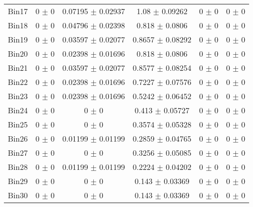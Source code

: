 \begin{tabular}{@{\extracolsep{4pt}}lccccc@{}}
     Bin17 & 0 $\pm$ 0 & 0.07195 $\pm$ 0.02937 & 1.08 $\pm$ 0.09262 & 0 $\pm$ 0 & 0 $\pm$ 0 \\ 
     Bin18 & 0 $\pm$ 0 & 0.04796 $\pm$ 0.02398 & 0.818 $\pm$ 0.0806 & 0 $\pm$ 0 & 0 $\pm$ 0 \\ 
     Bin19 & 0 $\pm$ 0 & 0.03597 $\pm$ 0.02077 & 0.8657 $\pm$ 0.08292 & 0 $\pm$ 0 & 0 $\pm$ 0 \\ 
     Bin20 & 0 $\pm$ 0 & 0.02398 $\pm$ 0.01696 & 0.818 $\pm$ 0.0806 & 0 $\pm$ 0 & 0 $\pm$ 0 \\ 
     Bin21 & 0 $\pm$ 0 & 0.03597 $\pm$ 0.02077 & 0.8577 $\pm$ 0.08254 & 0 $\pm$ 0 & 0 $\pm$ 0 \\ 
     Bin22 & 0 $\pm$ 0 & 0.02398 $\pm$ 0.01696 & 0.7227 $\pm$ 0.07576 & 0 $\pm$ 0 & 0 $\pm$ 0 \\ 
     Bin23 & 0 $\pm$ 0 & 0.02398 $\pm$ 0.01696 & 0.5242 $\pm$ 0.06452 & 0 $\pm$ 0 & 0 $\pm$ 0 \\ 
     Bin24 & 0 $\pm$ 0 & 0 $\pm$ 0 & 0.413 $\pm$ 0.05727 & 0 $\pm$ 0 & 0 $\pm$ 0 \\ 
     Bin25 & 0 $\pm$ 0 & 0 $\pm$ 0 & 0.3574 $\pm$ 0.05328 & 0 $\pm$ 0 & 0 $\pm$ 0 \\ 
     Bin26 & 0 $\pm$ 0 & 0.01199 $\pm$ 0.01199 & 0.2859 $\pm$ 0.04765 & 0 $\pm$ 0 & 0 $\pm$ 0 \\ 
     Bin27 & 0 $\pm$ 0 & 0 $\pm$ 0 & 0.3256 $\pm$ 0.05085 & 0 $\pm$ 0 & 0 $\pm$ 0 \\ 
     Bin28 & 0 $\pm$ 0 & 0.01199 $\pm$ 0.01199 & 0.2224 $\pm$ 0.04202 & 0 $\pm$ 0 & 0 $\pm$ 0 \\ 
     Bin29 & 0 $\pm$ 0 & 0 $\pm$ 0 & 0.143 $\pm$ 0.03369 & 0 $\pm$ 0 & 0 $\pm$ 0 \\ 
     Bin30 & 0 $\pm$ 0 & 0 $\pm$ 0 & 0.143 $\pm$ 0.03369 & 0 $\pm$ 0 & 0 $\pm$ 0 \\ 
\hline\hline
  \end{tabular}

